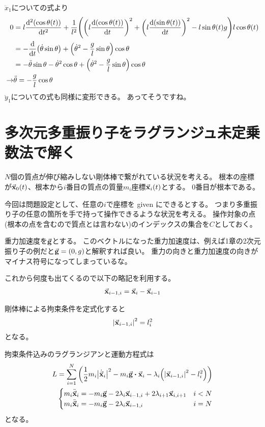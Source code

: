 \documentclass[uplatex]{jsarticle}
\begin{document}
$\ddot{x}_1$についての式より
\begin{align}
    0 &= l\dv[2]{\qty(\cos\theta(t))}{t}
        + \frac{1}{l^2} \qty(
            \qty(l\dv{\qty(\cos\theta(t))}{t})^2 + \qty(l\dv{\qty(\sin\theta(t))}{t})^2
            - l\sin{\theta(t)} g
        ) l\cos{\theta(t)} \nonumber \\
    &= -\dv{}{t}\qty(\dot{\theta}\sin\theta) + \qty(\dot{\theta}^2 - \frac{g}{l}\sin\theta) \cos\theta \nonumber \\
    &= -\ddot{\theta}\sin\theta - \dot{\theta}^2\cos\theta + \qty(\dot{\theta}^2 - \frac{g}{l}\sin\theta) \cos\theta \nonumber \\
    \rightarrow&
    \ddot{\theta} = -\frac{g}{l}\cos\theta
\end{align}
$\ddot{y}_1$についての式も同様に変形できる。
あってそうですね。

\section{多次元多重振り子をラグランジュ未定乗数法で解く}

$N$個の質点が伸び縮みしない剛体棒で繋がれている状況を考える。
根本の座標が$\va{x}_0(t)$、根本から$i$番目の質点の質量$m_i$座標$\va{x}_i(t)$とする。
$0$番目が根本である。

今回は問題設定として、任意の$i$で座標を given にできるとする。
つまり多重振り子の任意の箇所を手で持って操作できるような状況を考える。
操作対象の点(根本の点を含むので質点とは言わない)のインデックスの集合を$C$としておく。

重力加速度を$\va{g}$とする。
このベクトルになった重力加速度は、例えば1章の2次元振り子の例だと$\va{g} = (0, g)$と解釈すれば良い。
重力の向きと重力加速度の向きがマイナス符号になってしまっているな。

これから何度も出てくるので以下の略記を利用する。
\begin{align}
    \va{x}_{i-1,i} = \va{x}_i - \va{x}_{i-1}
\end{align}

剛体棒による拘束条件を定式化すると
\begin{align}
    \abs{\va{x}_{i-1,i}}^2 = l_i^2 \label{nd_mult_cons}
\end{align}
となる。

拘束条件込みのラグランジアンと運動方程式は
\begin{align}
    L &= \sum_{i=1}^N \qty(
        \frac{1}{2} m_i \abs{\dot{\va{x}}_i}^2
        - m_i \va{g} \vdot \va{x}_i
        - \lambda_i \qty(\abs{\va{x}_{i-1,i}}^2 - l_i^2)
    ) \\
    & \begin{cases}
        m_i \ddot{\va{x}}_i = -m_i \va{g} - 2\lambda_i \va{x}_{i-1,i} + 2\lambda_{i+1} \va{x}_{i,i+1} & i < N \\
        m_i \ddot{\va{x}}_i = -m_i \va{g} - 2\lambda_i \va{x}_{i-1,i} & i = N \\
    \end{cases}
    \label{ng_multi_eom}
\end{align}
となる。
\end{document}
